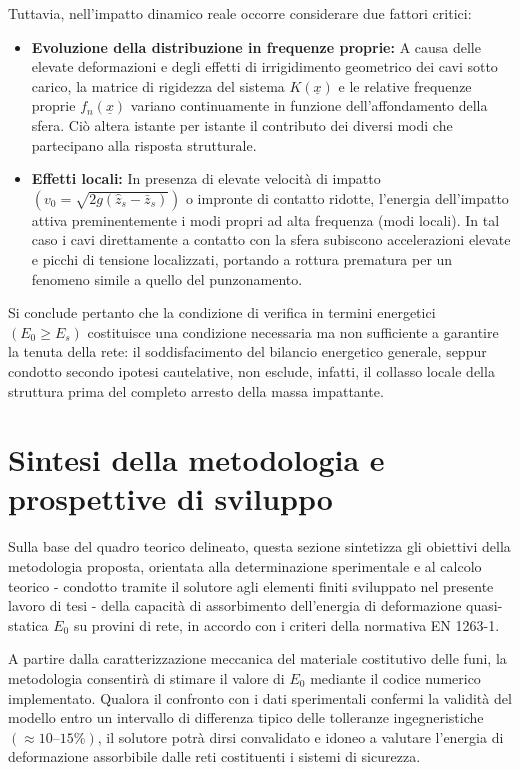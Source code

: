 Tuttavia, nell'impatto dinamico reale occorre considerare due fattori critici: 
\begin{itemize}
  \item \textbf{Evoluzione della distribuzione in frequenze proprie:} A causa delle elevate deformazioni e degli effetti di irrigidimento geometrico dei cavi sotto carico, la matrice di rigidezza del sistema $K(\underline{x})$ e le relative frequenze proprie $f_n(\underline{x})$ variano continuamente in funzione dell'affondamento della sfera. Ciò altera istante per istante il contributo dei diversi modi che partecipano alla risposta strutturale.
  \item \textbf{Effetti locali:} In presenza di elevate velocità di impatto $(v_0 = \sqrt{2g(\hat{z}_s - \bar{z}_s)})$ o impronte di contatto ridotte, l'energia dell'impatto attiva preminentemente i modi propri ad alta frequenza (modi locali). In tal caso i cavi direttamente a contatto con la sfera subiscono accelerazioni elevate e picchi di tensione localizzati, portando a rottura prematura per un fenomeno simile a quello del punzonamento.
\end{itemize}

Si conclude pertanto che la condizione di verifica in termini energetici $(E_0 \ge E_s)$ costituisce una condizione necessaria ma non sufficiente a garantire la tenuta della rete: il soddisfacimento del bilancio energetico generale, seppur condotto secondo ipotesi cautelative, non esclude, infatti, il collasso locale della struttura prima del completo arresto della massa impattante.

\section{Sintesi della metodologia e prospettive di sviluppo}\label{sec:sintesi_e_prospettive}
Sulla base del quadro teorico delineato, questa sezione sintetizza gli obiettivi della metodologia proposta, orientata alla determinazione sperimentale e al calcolo teorico - condotto tramite il solutore agli elementi finiti sviluppato nel presente lavoro di tesi - della capacità di assorbimento dell'energia di deformazione quasi-statica $E_0$ su provini di rete, in accordo con i criteri della normativa EN 1263-1.

A partire dalla caratterizzazione meccanica del materiale costitutivo delle funi, la metodologia consentirà di stimare il valore di $E_0$ mediante il codice numerico implementato. Qualora il confronto con i dati sperimentali confermi la validità del modello entro un intervallo di differenza tipico delle tolleranze ingegneristiche $(\approx 10\text{--}15\%)$, il solutore potrà dirsi convalidato e idoneo a valutare l'energia di deformazione assorbibile dalle reti costituenti i sistemi di sicurezza. 

